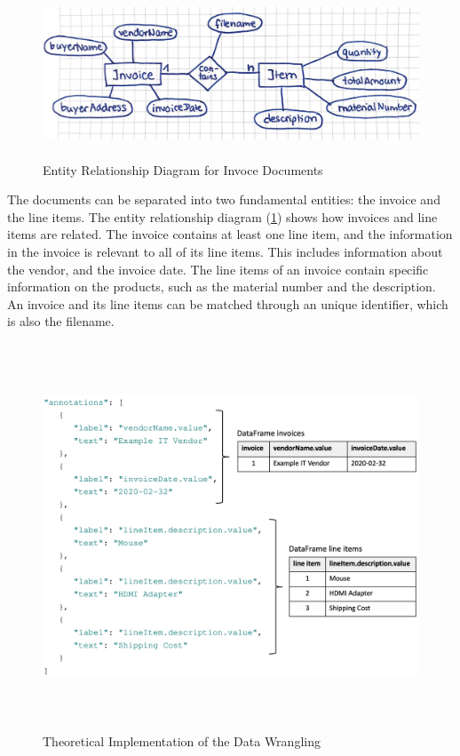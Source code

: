     \begin{figure}[ht]
        \centering
        \includegraphics[height=5cm]{Bilder/practical/entity_relationship.png}
        \caption{Entity Relationship Diagram for Invoce Documents}
        \label{fig:er}
    \end{figure}
	The documents can be separated into two fundamental entities: the invoice and the line items. The entity relationship diagram (\ref{fig:er}) shows how invoices and line items are related. The invoice contains at least one line item, and the information in the invoice is relevant to all of its line items. This includes information about the vendor, and the invoice date. The line items of an invoice contain specific information on the products, such as the material number and the description.
	An invoice and its line items can be matched through an unique identifier, which is also the filename.

	 \begin{figure}[ht]
		\centering
		\includegraphics[height=11.5cm]{Bilder/preprocessing/df_schema.png}
		\caption{Theoretical Implementation of the Data Wrangling}
		\label{fig:invoice_df_schema}
	\end{figure}	

